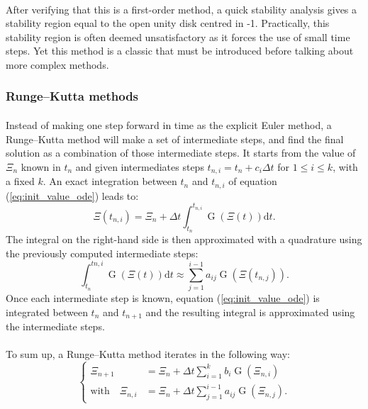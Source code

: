         \paragraph{}
        After verifying that this is a first-order method, a quick stability analysis gives a stability region equal to the open unity disk centred in -1.
        Practically, this stability region is often deemed unsatisfactory as it forces the use of small time steps.
        Yet this method is a classic that must be introduced before talking about more complex methods.


      \subsubsection{Runge--Kutta methods}

        \paragraph{}
        Instead of making one step forward in time as the explicit Euler method, a Runge--Kutta method will make a set of intermediate steps, and find the final solution as a combination of those intermediate steps.
        It starts from the value of $\Xi_n$ known in $t_n$ and given intermediates steps $t_{n, i} = t_n + c_i\Delta t$ for $1 \leq i \leq k$, with a fixed $k$.
        An exact integration between $t_n$ and $t_{n, i}$ of equation (\ref{eq:init_value_ode}) leads to:
        \begin{equation}
          \Xi\left(t_{n, i}\right) = \Xi_n + \Delta t \int_{t_n}^{t_{n,i}} \operatorname{G}\left(\Xi\left(t\right)\right) \mathrm{d}t .
        \end{equation}
        The integral on the right-hand side is then approximated with a quadrature using the previously computed intermediate steps:
        \begin{equation}
          \int_{t_n}^{t{n,i}} \operatorname{G}\left(\Xi\left(t\right)\right) \mathrm{d}t \approx \sum_{j = 1}^{i-1} a_{ij} \operatorname{G}\left(\Xi\left(t_{n,j}\right)\right) .
        \end{equation}
        Once each intermediate step is known, equation (\ref{eq:init_value_ode}) is integrated between $t_n$ and $t_{n+1}$ and the resulting integral is approximated using the intermediate steps.

        \paragraph{}
        To sum up, a Runge--Kutta method iterates in the following way:
        \begin{equation}\label{eq:rk}
          \left\{\begin{aligned}
            \Xi_{n+1} &= \Xi_n + \Delta t \sum_{i = 1}^k b_i \operatorname{G}\left(\Xi_{n,i}\right) \\
            \textrm{with}\quad \Xi_{n,i} &= \Xi_n + \Delta t \sum_{j = 1}^{i-1} a_{ij} \operatorname{G}\left(\Xi_{n,j}\right) .
          \end{aligned}\right.
        \end{equation}

